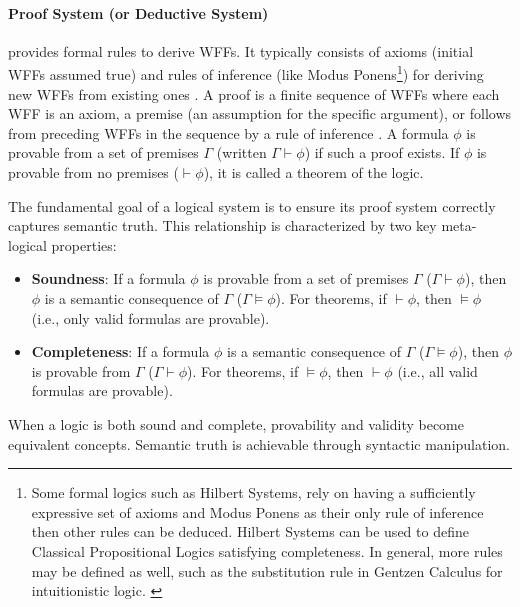 \paragraph{Proof System (or Deductive System)} provides formal rules to derive WFFs. It typically consists of axioms (initial WFFs assumed true) and rules of inference (like Modus Ponens\footnote{Some formal logics such as Hilbert Systems, rely on having a sufficiently expressive set of axioms and Modus Ponens as their only rule of inference then other rules can be deduced\cite[Sec.~1.2, Def.~1.2.6]{Hajek1998}. Hilbert Systems can be used to define Classical Propositional Logics satisfying completeness. In general, more rules may be defined as well, such as the substitution rule in Gentzen Calculus for intuitionistic logic. \cite[p.~39,64]{ResiduatedLattices2007}}) for deriving new WFFs from existing ones \cite[Sec.~5.1, 5.3]{Agler2013SymbolicLogic}. A proof is a finite sequence of WFFs where each WFF is an axiom, a premise (an assumption for the specific argument), or follows from preceding WFFs in the sequence by a rule of inference \cite[Sec.~5.1]{Agler2013SymbolicLogic}. A formula $\phi$ is provable from a set of premises $\Gamma$ (written $\Gamma \vdash \phi$) if such a proof exists. If $\phi$ is provable from no premises ($\vdash \phi$), it is called a theorem of the logic.

The fundamental goal of a logical system is to ensure its proof system correctly captures semantic truth. This relationship is characterized by two key meta-logical properties:
\begin{itemize}
    \item \textbf{Soundness}: If a formula $\phi$ is provable from a set of premises $\Gamma$ ($\Gamma \vdash \phi$), then $\phi$ is a semantic consequence of $\Gamma$ ($\Gamma \models \phi$). For theorems, if $\vdash \phi$, then $\models \phi$ (i.e., only valid formulas are provable).\cite[Lemma~1.2.7]{Hajek1998}
    \item \textbf{Completeness}: If a formula $\phi$ is a semantic consequence of $\Gamma$ ($\Gamma \models \phi$), then $\phi$ is provable from $\Gamma$ ($\Gamma \vdash \phi$). For theorems, if $\models \phi$, then $\vdash \phi$ (i.e., all valid formulas are provable).\cite[Lemma~1.2.9]{Hajek1998}
\end{itemize}
When a logic is both sound and complete, provability and validity become equivalent concepts. Semantic truth is achievable through syntactic manipulation.\cite[Thm.~1.2.11]{Hajek1998}





